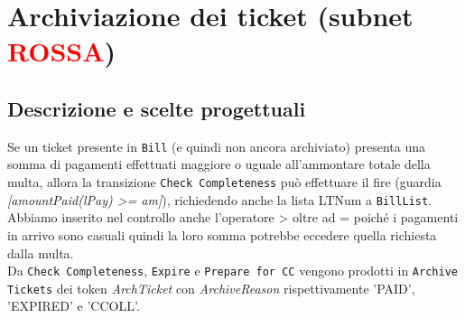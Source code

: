 \documentclass[../Relazione.tex]{subfiles}
\begin{document}
\section{Archiviazione dei ticket \small(subnet \textcolor{red}{ROSSA})}
    
    \subsection{Descrizione e scelte progettuali}
        Se un ticket presente in \texttt{Bill} (e quindi non ancora archiviato) presenta una somma di pagamenti effettuati maggiore o uguale all'ammontare totale della multa, allora la transizione \texttt{Check Completeness} può effettuare il fire (guardia \textit{[amountPaid(lPay) >= am]}), richiedendo anche la lista LTNum a \texttt{BillList}.\\
        Abbiamo inserito nel controllo anche l'operatore > oltre ad = poiché i pagamenti in arrivo sono casuali quindi la loro somma potrebbe eccedere quella richiesta dalla multa.\\
        Da \texttt{Check Completeness}, \texttt{Expire} e \texttt{Prepare for CC} vengono prodotti in \texttt{Archive Tickets} dei token \textit{ArchTicket} con \textit{ArchiveReason} rispettivamente 'PAID', 'EXPIRED' e 'CCOLL'.
        
\end{document}
